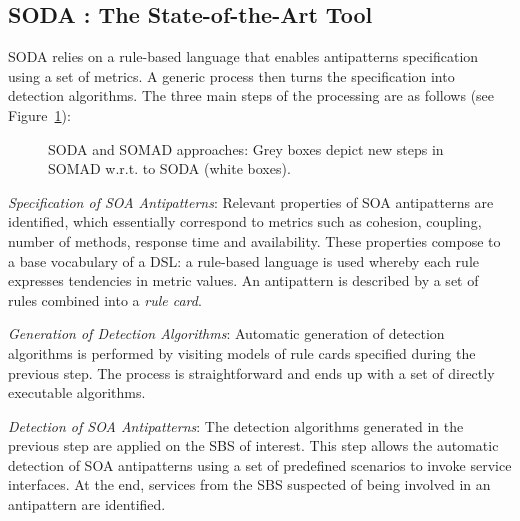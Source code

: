 \subsection{SODA : The State-of-the-Art Tool\label{SODA}}

SODA relies on a rule-based language that enables antipatterns specification using a set of metrics. A generic process then turns the specification into detection algorithms. The three main steps of the processing are as follows (see Figure~\ref{fig:The-SODA-approach}):

\begin{figure}
\caption{\label{fig:The-SODA-approach}SODA and SOMAD approaches: Grey boxes depict new steps in SOMAD w.r.t. to SODA (white boxes).}
\end{figure}

\emph{Specification of SOA Antipatterns}: Relevant properties of SOA antipatterns are identified, which essentially correspond to metrics such as cohesion, coupling, number of methods, response time and availability. These properties compose to a base vocabulary of a DSL: a rule-based language is used whereby each rule expresses tendencies in metric values. An antipattern is described by a set of rules combined into a \textit{rule card}.

\vspace{0.12cm}

\emph{Generation of Detection Algorithms}: Automatic generation of detection algorithms is performed by visiting models of rule cards specified during the previous step. The process is straightforward and ends up with a set of directly executable algorithms.

\vspace{0.12cm}

\emph{Detection of SOA Antipatterns}: The detection algorithms generated in the previous step are applied on the SBS of interest. This step allows the automatic detection of SOA antipatterns using a set of predefined scenarios to invoke service interfaces. At the end, services from the SBS suspected of being involved in an antipattern are identified.

